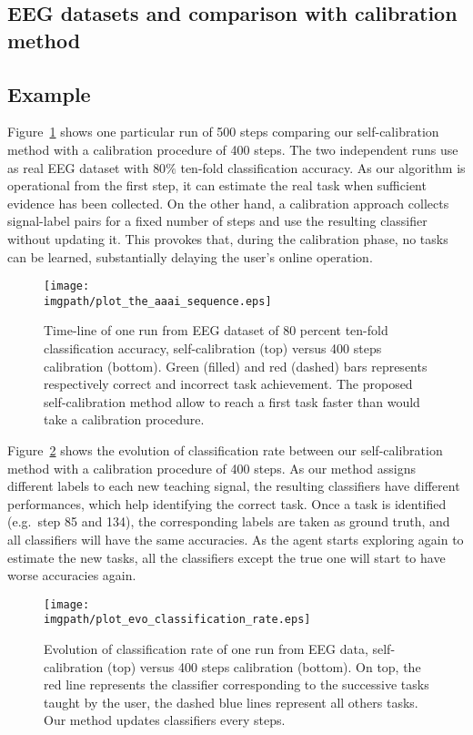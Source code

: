 \subsection{EEG datasets and comparison with calibration method}

\subsection{Example}
Figure~\ref{fig:sequence} shows one particular run of 500 steps comparing our self-calibration method with a calibration procedure of 400 steps. The two independent runs use as real EEG dataset with $80\%$ ten-fold classification accuracy. As our algorithm is operational from the first step, it can estimate the real task when sufficient evidence has been collected. On the other hand, a calibration approach collects signal-label pairs for a fixed number of steps and use the resulting classifier without updating it. This provokes that, during the calibration phase, no tasks can be learned, substantially delaying the user's online operation.

\begin{figure}[!ht]
\centering
\texttt{[image: \\imgpath/plot\_the\_aaai\_sequence.eps]}
\caption{Time-line of one run from EEG dataset of $80$ percent ten-fold classification accuracy, self-calibration (top) versus 400 steps calibration (bottom). Green (filled) and red (dashed) bars represents respectively correct and incorrect task achievement. The proposed self-calibration method allow to reach a first task faster than would take a calibration procedure.}
\label{fig:sequence}
\end{figure} 



Figure~\ref{fig:sequence_evolution} shows the evolution of classification rate between our self-calibration method with a calibration procedure of 400 steps. As our method assigns different labels to each new teaching signal, the resulting classifiers have different performances, which help identifying the correct task. Once a task is identified (e.g.\ step 85 and 134), the corresponding labels are taken as ground truth, and all classifiers will have the same accuracies. As the agent starts exploring again to estimate the new tasks, all the classifiers except the true one will start to have worse accuracies again.

\begin{figure}[!ht]
\centering
\texttt{[image: \\imgpath/plot\_evo\_classification\_rate.eps]}
\caption{Evolution of classification rate of one run from EEG data, self-calibration (top) versus 400 steps calibration (bottom). On top, the red line represents the classifier corresponding to the successive tasks taught by the user, the dashed blue lines represent all others tasks. Our method updates classifiers every steps.}
\label{fig:sequence_evolution}
\end{figure} 

